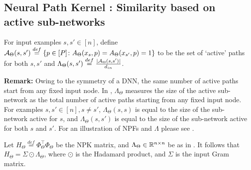 
\subsection{Neural Path Kernel : Similarity based on active sub-networks}
\begin{comment}
\begin{definition}\label{def:lambda}
For input examples $s, s'\in[n]$ define 

$1.$ $\tau_{\Theta}(s,s',l)\stackrel{def}=\sum_{i=1}^w G_{x_s,\Theta}(l,i)G_{x_{s'},\Theta}(l,i)$ be the number of activations that are ``on'' for both inputs $s,s'\in[n]$ in layer $l\in[d-1]$.

$2.$ $\Lambda_{\Theta}(s,s')\stackrel{def}=\Pi_{l=1}^{d-1}\tau_{\Theta}(s,s',l)$.
\end{definition}
\end{comment}
\begin{definition}\label{def:lambda}
 For input examples $s,s'\in[n]$, define $\mathcal{A}_{\Theta}(s,s')\stackrel{def}=\{p\in[P]\colon A_{\Theta}(x_s,p)= A_{\Theta}(x_{s'},p)=1\}$ to be the set of `active' paths for both $s,s'$  and $\Lambda_{\Theta}(s,s')\stackrel{def}=\frac{|\mathcal{A}_{\Theta}(s,s')|}{d_{in}}$.
\end{definition}
\textbf{Remark:} Owing to the symmetry of a DNN, the same number of active paths start from any fixed input node. In , $\Lambda_{\Theta}$ measures the size of the active sub-network as the total number of active paths starting from any fixed input node. For examples $s,s'\in[n],s\neq s'$, $\Lambda_{\Theta}(s,s)$ is equal to the size of the sub-network active for $s$, and $\Lambda_{\Theta}(s,s')$ is equal to the size of the sub-network active for both $s$ and $s'$. For an illustration of NPFs and $\Lambda$ please see .
\begin{lemma}\label{lm:npk}
Let $H_{\Theta}\stackrel{def}{=}\Phi^\top_{\Theta}\Phi_{\Theta}$ be the NPK matrix, and $\Lambda_{\Theta}\in\mathbb{R}^{n\times n}$ be as in  . It follows that $H_{\Theta}= \Sigma\odot\Lambda_{\Theta}$, where $\odot$ is  the Hadamard product, and $\Sigma$ is the input Gram matrix.
\end{lemma}
